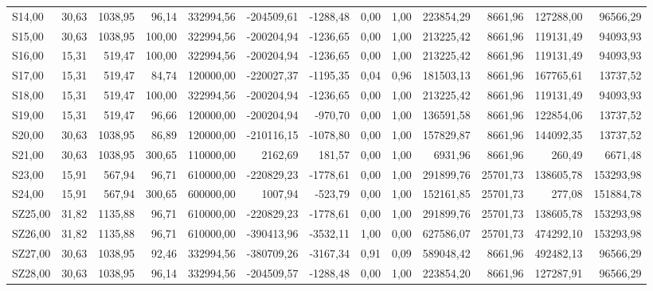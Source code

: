 \begin{longtable}{lrrrrrrrrrrrr}
S14,00 & 30,63 & 1038,95 & 96,14 & 332994,56 & -204509,61 & -1288,48 & 0,00 & 1,00 & 223854,29 & 8661,96 & 127288,00 & 96566,29 \\
S15,00 & 30,63 & 1038,95 & 100,00 & 322994,56 & -200204,94 & -1236,65 & 0,00 & 1,00 & 213225,42 & 8661,96 & 119131,49 & 94093,93 \\
S16,00 & 15,31 & 519,47 & 100,00 & 322994,56 & -200204,94 & -1236,65 & 0,00 & 1,00 & 213225,42 & 8661,96 & 119131,49 & 94093,93 \\
S17,00 & 15,31 & 519,47 & 84,74 & 120000,00 & -220027,37 & -1195,35 & 0,04 & 0,96 & 181503,13 & 8661,96 & 167765,61 & 13737,52 \\
S18,00 & 15,31 & 519,47 & 100,00 & 322994,56 & -200204,94 & -1236,65 & 0,00 & 1,00 & 213225,42 & 8661,96 & 119131,49 & 94093,93 \\
S19,00 & 15,31 & 519,47 & 96,66 & 120000,00 & -200204,94 & -970,70 & 0,00 & 1,00 & 136591,58 & 8661,96 & 122854,06 & 13737,52 \\
S20,00 & 30,63 & 1038,95 & 86,89 & 120000,00 & -210116,15 & -1078,80 & 0,00 & 1,00 & 157829,87 & 8661,96 & 144092,35 & 13737,52 \\
S21,00 & 30,63 & 1038,95 & 300,65 & 110000,00 & 2162,69 & 181,57 & 0,00 & 1,00 & 6931,96 & 8661,96 & 260,49 & 6671,48 \\
S23,00 & 15,91 & 567,94 & 96,71 & 610000,00 & -220829,23 & -1778,61 & 0,00 & 1,00 & 291899,76 & 25701,73 & 138605,78 & 153293,98 \\
S24,00 & 15,91 & 567,94 & 300,65 & 600000,00 & 1007,94 & -523,79 & 0,00 & 1,00 & 152161,85 & 25701,73 & 277,08 & 151884,78 \\
SZ25,00 & 31,82 & 1135,88 & 96,71 & 610000,00 & -220829,23 & -1778,61 & 0,00 & 1,00 & 291899,76 & 25701,73 & 138605,78 & 153293,98 \\
SZ26,00 & 31,82 & 1135,88 & 96,71 & 610000,00 & -390413,96 & -3532,11 & 1,00 & 0,00 & 627586,07 & 25701,73 & 474292,10 & 153293,98 \\
SZ27,00 & 30,63 & 1038,95 & 92,46 & 332994,56 & -380709,26 & -3167,34 & 0,91 & 0,09 & 589048,42 & 8661,96 & 492482,13 & 96566,29 \\
SZ28,00 & 30,63 & 1038,95 & 96,14 & 332994,56 & -204509,57 & -1288,48 & 0,00 & 1,00 & 223854,20 & 8661,96 & 127287,91 & 96566,29 \\
\hline
\end{longtable}
